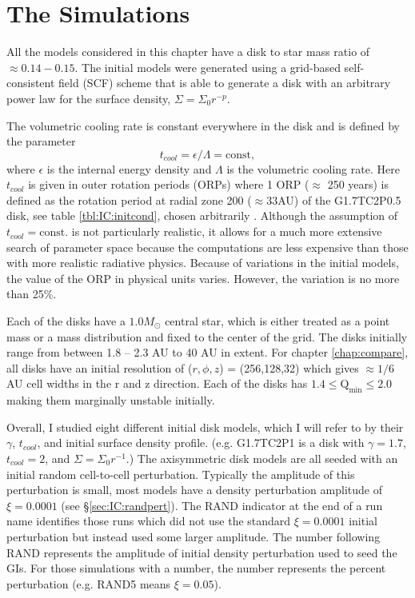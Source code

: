 \section{The Simulations}\label{sec:IC:initialmodel}

All the models considered in this chapter have a disk to star mass ratio of $\approx 0.14-0.15$.  The initial models were generated using a grid-based self-consistent field (SCF) scheme \citep{hachisu1986,pickett1996,pickett2003} that is able to generate a disk with an arbitrary power law for the surface density, $\Sigma = \Sigma_0 r^{-p}$. 

The volumetric cooling rate is constant everywhere in the disk and is defined by the parameter
\begin{equation}\label{eq:IC:tcool}
t_{cool}=\epsilon/\Lambda= \mathrm{const},
\end{equation}
where $\epsilon$ is the internal energy density and $\Lambda$ is the volumetric cooling rate. Here $t_{cool}$ is given in outer rotation periods (ORPs) where 1 ORP ($\approx$ 250 years) is defined as the rotation period at radial zone 200 ($\approx 33$AU) of the G1.7TC2P0.5 disk, see table \ref{tbl:IC:initcond}, chosen arbitrarily \citep{mejia2005}. Although the assumption of $t_{cool}=\mathrm{const.}$ is not particularly realistic, it allows for a much more extensive search of parameter space because the computations are less expensive than those with more realistic radiative physics. Because of variations in the initial models, the value of the ORP in physical units varies. However, the variation is no more than 25\%.

Each of the disks have a $1.0 M_{\odot}$ central star, which is either treated as a point mass or a mass distribution and fixed to the center of the grid. The disks initially range from between 1.8 -- 2.3 AU to 40 AU in extent. For chapter \ref{chap:compare}, all disks have an initial resolution of ($r,\phi,z$) = (256,128,32) which gives $\approx 1/6$ AU cell widths in the r and z direction. Each of the disks has $1.4\leq \mathrm{Q_{min}}\leq 2.0$ making them marginally unstable initially. 

Overall, I studied eight different initial disk models, which I will refer to by their $\gamma$, $t_{cool}$, and initial surface density profile. (e.g. G1.7TC2P1 is a disk with $\gamma = 1.7$, $t_{cool} = 2$, and $\Sigma = \Sigma_0 r^{-1}$.) The axisymmetric disk models are all seeded with an initial random cell-to-cell perturbation. Typically the amplitude of this perturbation is small, most models have a density perturbation amplitude of $\xi = 0.0001$ (see \S\ref{sec:IC:randpert}). The RAND indicator at the end of a run name identifies those runs which did not use the standard $\xi = 0.0001$ initial perturbation but instead used some larger amplitude. The number following RAND represents the amplitude of initial density perturbation used to seed the GIs. For those simulations with a number, the number represents the percent perturbation (e.g. RAND5 means $\xi = 0.05$).

